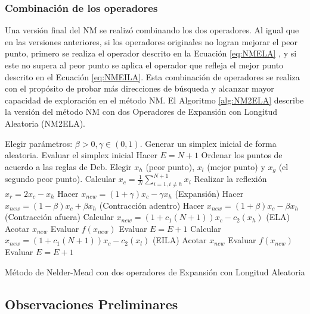 \subsubsection{Combinación de los operadores}
Una versión final del NM se realizó combinando los dos operadores. Al igual que en las versiones anteriores, si los operadores originales no logran mejorar el peor punto, primero se realiza el operador descrito en la Ecuación \ref{eq:NMELA} , y si este no supera al peor punto se aplica el operador que refleja el mejor punto descrito en el Ecuación \ref{eq:NMEILA}. Esta combinación de operadores se realiza con el propósito de probar más direcciones de búsqueda y alcanzar mayor capacidad de exploración en el método NM. El Algoritmo \ref{alg:NM2ELA} describe la versión del método NM con dos Operadores de Expansión con Longitud Aleatoria (NM2ELA). 

\begin{algorithm}
	\begin{algorithmic}[1]
		\STATE Elegir parámetros: $\beta>0, \gamma \in (0,1)$. 
		\STATE Generar un simplex inicial de forma aleatoria.
        \STATE Evaluar el simplex inicial
        \STATE Hacer $E=N+1$
		\label{lin:lineaRara}
		\STATE Ordenar los puntos de acuerdo a las reglas de Deb.
		\STATE Elegir $x_h$ (peor punto), $x_l$ (mejor punto) y $x_g$ (el segundo peor punto).
		\STATE Calcular $x_c=\frac{1}{N} \sum_{i=1, i\neq h }^{N+1} x_i$
		\STATE Realizar la reflexión $x_r=2x_c -x_h$
		\STATE Hacer $x_{new}=(1+\gamma)x_c-\gamma x_h$ (Expansión)
		\ELSE {}
		\STATE Hacer $x_{new}=(1-\beta)x_c+\beta x_h$ (Contracción adentro)
		\ENDIF
		\ELSE {}
		\STATE Hacer $x_{new}=(1+\beta)x_c-\beta x_h$ (Contracción afuera)
		\ENDIF
		\ENDIF
		\STATE Calcular  $x_{new}=(1+c_1(N+1))x_c-c_2 (x_h)$ (ELA)
		\ENDIF
        \STATE Acotar   $x_{new}$
        \STATE Evaluar  $f(x_{new})$
        \STATE Evaluar  $E=E+1$
		\STATE Calcular  $x_{new}=(1+c_1(N+1))x_c-c_2 (x_l)$ (EILA)
        \STATE Acotar   $x_{new}$
        \STATE Evaluar  $f(x_{new})$
        \STATE Evaluar  $E=E+1$
		\ENDIF
		\ENDWHILE
	\end{algorithmic}
	\caption{Método de Nelder-Mead con dos operadores de Expansión con Longitud Aleatoria}
    \label{alg:NM2ELA}
\end{algorithm}

\subsection{Observaciones Preliminares}

